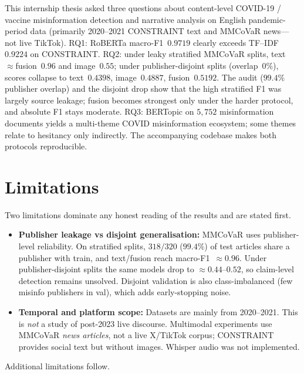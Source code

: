 \documentclass[12pt, a4paper]{report}
\begin{document}
This internship thesis asked three questions about content-level COVID-19 / vaccine misinformation detection and narrative analysis on English pandemic-period data (primarily 2020--2021 CONSTRAINT text and MMCoVaR news---not live TikTok).
RQ1: RoBERTa macro-F1~$0.9719$ clearly exceeds TF--IDF~$0.9224$ on CONSTRAINT.
RQ2: under leaky stratified MMCoVaR splits, text~$\approx$fusion~$0.96$ and image~$0.55$; under publisher-disjoint splits (overlap~$0\%$), scores collapse to text~$0.4398$, image~$0.4887$, fusion~$0.5192$.
The audit ($99.4\%$ publisher overlap) and the disjoint drop show that the high stratified F1 was largely source leakage; fusion becomes strongest only under the harder protocol, and absolute F1 stays moderate.
RQ3: BERTopic on $5{,}752$ misinformation documents yields a multi-theme COVID misinformation ecosystem; some themes relate to hesitancy only indirectly.
The accompanying codebase makes both protocols reproducible.

\section{Limitations}
\label{sec:limitations}

Two limitations dominate any honest reading of the results and are stated first.

\begin{itemize}
  \item \textbf{Publisher leakage vs disjoint generalisation:}
        MMCoVaR uses publisher-level reliability.
        On stratified splits, $318/320$ ($99.4\%$) of test articles share a publisher with train, and text/fusion reach macro-F1~$\approx 0.96$.
        Under publisher-disjoint splits the same models drop to $\approx 0.44$--$0.52$, so claim-level detection remains unsolved.
        Disjoint validation is also class-imbalanced (few misinfo publishers in val), which adds early-stopping noise.
  \item \textbf{Temporal and platform scope:}
        Datasets are mainly from 2020--2021.
        This is \emph{not} a study of post-2023 live discourse.
        Multimodal experiments use MMCoVaR \emph{news articles}, not a live X/TikTok corpus; CONSTRAINT provides social text but without images.
        Whisper audio was not implemented.
\end{itemize}

Additional limitations follow.
\end{document}
